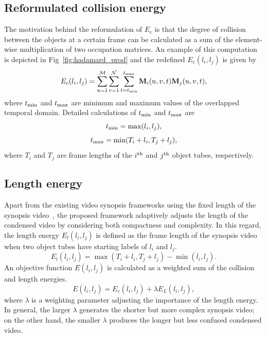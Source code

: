 \documentclass[11pt]{hyu_thesis}
\begin{document}
\subsection{Reformulated collision energy}
The motivation behind the reformulation of $E_c$ is that the degree of collision between the objects at a certain frame can be calculated as a sum of the element-wise multiplication of two occupation matrices. An example of this computation is depicted in Fig~\ref{fig:hadamard_prod} and the redefined $E_c(l_i,l_j)$ is given by
\begin{equation}
\label{eq:EcNew}
E_c(l_i,l_j) = \sum_{u=1}^{\mathcal{M}}\sum_{v=1}^{\mathcal{N}}\sum_{t=t_{\rm{min}}}^{t_{\rm{max}}} \textbf{M}_i(u,v,t)\textbf{M}_j(u,v,t),
\end{equation}
where $t_{\rm{min}}$ and $t_{\rm{max}}$ are minimum and maximum values of the overlapped temporal domain. Detailed calculations of $t_{\rm{min}}$ and $t_{\rm{max}}$ are
\begin{equation}
\label{eq:t_min}
t_{\rm{min}} = \max(l_i, l_j),
\end{equation}
\begin{equation}
\label{eq:t_max}
t_{\rm{max}} = \min(T_i + l_i, T_j + l_j),
\end{equation}
where $T_i$ and $T_j$ are frame lengths of the $i^{\rm{th}}$ and $j^{\rm{th}}$ object tubes, respectively.

\subsection{Length energy}
Apart from the existing video synopsis frameworks using the fixed length of the synopsis video~\cite{}, the proposed framework adaptively adjusts the length of the condensed video by considering both compactness and complexity. In this regard, the length energy $E_l (l_i,l_j)$ is defined as the frame length of the synopsis video when two object tubes have starting labels of $l_i$ and $l_j$.
\begin{equation}
\label{eq:El}
E_l(l_i, l_j) = \max(T_i + l_i, T_j + l_j) - \min(l_i, l_j).
\end{equation}
An objective function $E(l_i,l_j)$ is calculated as a weighted sum of the collision and length energies.
\begin{equation}
\label{eq:obj_func}
E(l_i, l_j) = E_c(l_i, l_j) + \lambda E_L(l_i, l_j),
\end{equation}
where $\lambda$ is a weighting parameter adjusting the importance of the length energy. In general, the larger $\lambda$ generates the shorter but more complex synopsis video; on the other hand, the smaller $\lambda$ produces the longer but less confused condensed video.
\end{document}
